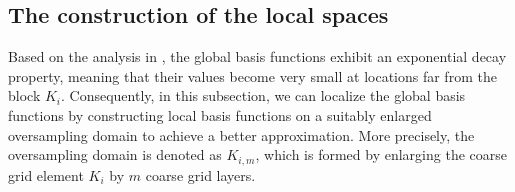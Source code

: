 \documentclass[preprint,12pt]{elsarticle}
\begin{document}
\subsection{The construction of the local spaces}
Based on the analysis in \cite{chung2018constraint}, the global basis functions exhibit an exponential decay property, meaning that their values become very small at locations far from the block $K_i$. Consequently, in this subsection, we can localize the global basis functions by constructing local basis functions on a suitably enlarged oversampling domain to achieve a better approximation. More precisely, the oversampling domain is denoted as $K_{i,m}$, which is formed by enlarging the coarse grid element $K_i$ by $m$ coarse grid layers.
\end{document}
